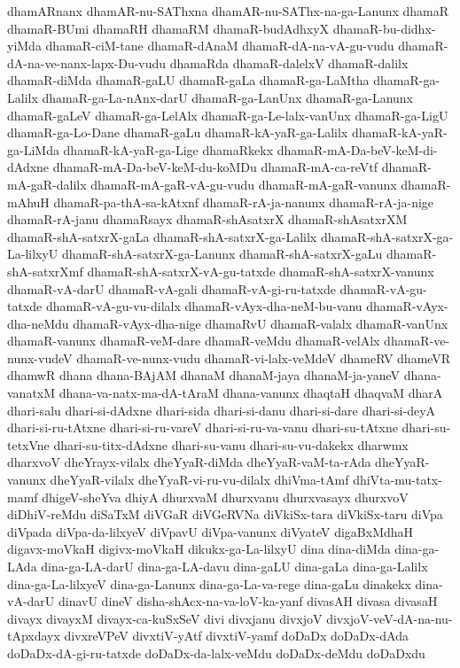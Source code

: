{dhamARnanx
dhamAR-nu-SAThxna
dhamAR-nu-SAThx-na-ga-Lanunx
dhamaR
dhamaR-BUmi
dhamaRH
dhamaRM
dhamaR-budAdhxyX
dhamaR-bu-didhx-yiMda
dhamaR-ciM-tane
dhamaR-dAnaM
dhamaR-dA-na-vA-gu-vudu
dhamaR-dA-na-ve-nanx-lapx-Du-vudu
dhamaRda
dhamaR-dalelxV
dhamaR-dalilx
dhamaR-diMda
dhamaR-gaLU
dhamaR-gaLa
dhamaR-ga-LaMtha
dhamaR-ga-Lalilx
dhamaR-ga-La-nAnx-darU
dhamaR-ga-LanUnx
dhamaR-ga-Lanunx
dhamaR-gaLeV
dhamaR-ga-LelAlx
dhamaR-ga-Le-lalx-vanUnx
dhamaR-ga-LigU
dhamaR-ga-Lo-Dane
dhamaR-gaLu
dhamaR-kA-yaR-ga-Lalilx
dhamaR-kA-yaR-ga-LiMda
dhamaR-kA-yaR-ga-Lige
dhamaRkekx
dhamaR-mA-Da-beV-keM-di-dAdxne
dhamaR-mA-Da-beV-keM-du-koMDu
dhamaR-mA-ca-reVtf
dhamaR-mA-gaR-dalilx
dhamaR-mA-gaR-vA-gu-vudu
dhamaR-mA-gaR-vanunx
dhamaR-mAhuH
dhamaR-pa-thA-sa-kAtxnf
dhamaR-rA-ja-nanunx
dhamaR-rA-ja-nige
dhamaR-rA-janu
dhamaRsayx
dhamaR-shAsatxrX
dhamaR-shAsatxrXM
dhamaR-shA-satxrX-gaLa
dhamaR-shA-satxrX-ga-Lalilx
dhamaR-shA-satxrX-ga-La-lilxyU
dhamaR-shA-satxrX-ga-Lanunx
dhamaR-shA-satxrX-gaLu
dhamaR-shA-satxrXmf
dhamaR-shA-satxrX-vA-gu-tatxde
dhamaR-shA-satxrX-vanunx
dhamaR-vA-darU
dhamaR-vA-gali
dhamaR-vA-gi-ru-tatxde
dhamaR-vA-gu-tatxde
dhamaR-vA-gu-vu-dilalx
dhamaR-vAyx-dha-neM-bu-vanu
dhamaR-vAyx-dha-neMdu
dhamaR-vAyx-dha-nige
dhamaRvU
dhamaR-valalx
dhamaR-vanUnx
dhamaR-vanunx
dhamaR-veM-dare
dhamaR-veMdu
dhamaR-velAlx
dhamaR-ve-nunx-vudeV
dhamaR-ve-nunx-vudu
dhamaR-vi-lalx-veMdeV
dhameRV
dhameVR
dhamwR
dhana
dhana-BAjAM
dhanaM
dhanaM-jaya
dhanaM-ja-yaneV
dhana-vanatxM
dhana-va-natx-ma-dA-tAraM
dhana-vanunx
dhaqtaH
dhaqvaM
dharA
dhari-salu
dhari-si-dAdxne
dhari-sida
dhari-si-danu
dhari-si-dare
dhari-si-deyA
dhari-si-ru-tAtxne
dhari-si-ru-vareV
dhari-si-ru-va-vanu
dhari-su-tAtxne
dhari-su-tetxVne
dhari-su-titx-dAdxne
dhari-su-vanu
dhari-su-vu-dakekx
dharwmx
dharxvoV
dheYrayx-vilalx
dheYyaR-diMda
dheYyaR-vaM-ta-rAda
dheYyaR-vanunx
dheYyaR-vilalx
dheYyaR-vi-ru-vu-dilalx
dhiVma-tAmf
dhiVta-mu-tatx-mamf
dhigeV-sheYva
dhiyA
dhurxvaM
dhurxvanu
dhurxvasayx
dhurxvoV
diDhiV-reMdu
diSaTxM
diVGaR
diVGeRVNa
diVkiSx-tara
diVkiSx-taru
diVpa
diVpada
diVpa-da-lilxyeV
diVpavU
diVpa-vanunx
diVyateV
digaBxMdhaH
digavx-moVkaH
digivx-moVkaH
dikukx-ga-La-lilxyU
dina
dina-diMda
dina-ga-LAda
dina-ga-LA-darU
dina-ga-LA-davu
dina-gaLU
dina-gaLa
dina-ga-Lalilx
dina-ga-La-lilxyeV
dina-ga-Lanunx
dina-ga-La-va-rege
dina-gaLu
dinakekx
dina-vA-darU
dinavU
dineV
disha-shAcx-na-va-loV-ka-yanf
divasAH
divasa
divasaH
divayx
divayxM
divayx-ca-kuSxSeV
divi
divxjanu
divxjoV
divxjoV-veV-dA-na-nu-tApxdayx
divxreVPeV
divxtiV-yAtf
divxtiV-yamf
doDaDx
doDaDx-dAda
doDaDx-dA-gi-ru-tatxde
doDaDx-da-lalx-veMdu
doDaDx-deMdu
doDaDxdu
}
